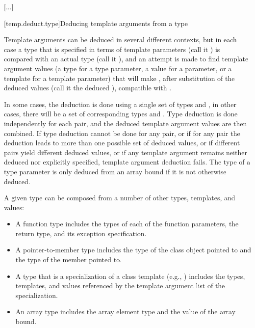 \documentclass{wg21}
\begin{document}
\textcolor{noteclr}{[...]}

[temp.deduct.type]{Deducing template arguments from a type}

\pnum
Template arguments can be deduced in several different contexts, but
in each case a type that is specified in terms of template parameters
(call it
)
is compared with an actual type (call it
),
and an attempt is made to find template argument values (a type for a type
parameter, a value for a  parameter, or a template for a
template parameter) that will make
,
after substitution of the deduced values (call it the deduced
),
compatible with
.

\pnum
In some cases, the deduction is done using a single set of types
and
,
in other cases, there will be a set of corresponding types
and
.
Type deduction is done
independently for each
pair, and the deduced template
argument values are then combined.
If type deduction cannot be done
for any
pair, or if for any pair the deduction leads to more than
one possible set of deduced values, or if different pairs yield
different deduced values, or if any template argument remains neither
deduced nor explicitly specified, template argument deduction fails.
The type of a type parameter
is only deduced from an array bound
if it is not otherwise deduced.

\pnum
A given type
can be composed from a number of other
types, templates, and  values:

\begin{itemize}
    \item
    A function type includes the types of each of the function parameters,
    the return type, and its exception specification.
    \item
    A pointer-to-member type includes the type of the class object pointed to
    and the type of the member pointed to.
    \item
    A type that is a specialization of a class template (e.g.,
    )
    includes the types, templates, and  values referenced by the
    template argument list of the specialization.
    \item
    An array type includes the array element type and the value of the
    array bound.
\end{itemize}
\end{document}
